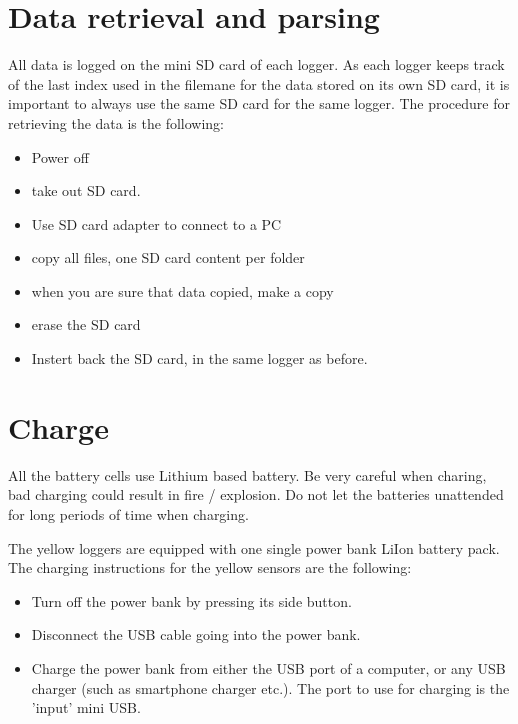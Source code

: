 \documentclass[pdftex,a4paper,12pt,twocolumn,fleqn,captions=tableheading]{scrartcl}
\begin{document}
\section{Data retrieval and parsing}

All data is logged on the mini SD card of each logger. As each logger keeps track of the last index used in the filemane for the data stored on its own SD card, it is important to always use the same SD card for the same logger. The procedure for retrieving the data is the following:

\begin{itemize}
  \item Power off

  \item take out SD card.

  \item Use SD card adapter to connect to a PC

  \item copy all files, one SD card content per folder

  \item when you are sure that data copied, make a copy

  \item erase the SD card

  \item Instert back the SD card, in the same logger as before.
\end{itemize}

\section{Charge}

All the battery cells use Lithium based battery. Be very careful when charing, bad charging could result in fire / explosion. Do not let the batteries unattended for long periods of time when charging.

The yellow loggers are equipped with one single power bank LiIon battery pack. The charging instructions for the yellow sensors are the following:

\begin{itemize}
  \item Turn off the power bank by pressing its side button.

  \item Disconnect the USB cable going into the power bank.

  \item Charge the power bank from either the USB port of a computer, or any USB charger (such as smartphone charger etc.). The port to use for charging is the 'input' mini USB.
\end{itemize}
\end{document}
